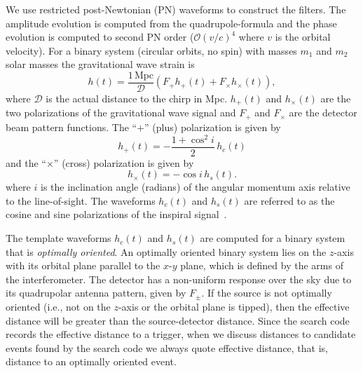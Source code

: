 We use restricted post-Newtonian (PN) waveforms to construct the filters. The
amplitude evolution is computed from the quadrupole-formula\cite{petersmath}
and the phase evolution is computed to second PN order ($\mathcal{O}(v/c)^4$
where $v$ is the orbital velocity).  For a binary system (circular orbits, no
spin) with masses $m_1$ and $m_2$ solar masses the gravitational wave strain
is
\begin{equation}
h(t) = \frac{1\,\mathrm{Mpc}}{\mathcal{D}}\left(F_{+}h_{+}(t) +
F_{\times}h_{\times}(t)\right),
\end{equation}
where $\mathcal{D}$ is the actual distance to the chirp in Mpc. $h_{+}(t)$
and $h_{\times}(t)$ are the two polarizations of the gravitational wave signal
and $F_{+}$ and $F_{\times}$ are the detector beam pattern functions. The
``$+$'' (plus) polarization is given by
\begin{equation}
h_{+}(t) = -\frac{1 + \cos^2 i}{2}\,h_c(t)
\end{equation}
and the ``$\times$'' (cross) polarization is given by
\begin{equation}
h_{\times}(t) = -\cos i\,h_s(t).
\end{equation}
where $i$ is the inclination angle (radians) of the angular momentum axis
relative to the line-of-sight. The waveforms $h_c(t)$ and $h_s(t)$ are referred
to as the cosine and sine polarizations of the inspiral signal~\cite{biww}.

The template waveforms $h_c(t)$ and $h_s(t)$ are computed for a binary
system that is {\it optimally oriented}. An optimally oriented binary system
lies on the $z$-axis with its orbital plane parallel to the $x$-$y$ plane,
which is defined by the arms of the interferometer. The detector has a
non-uniform response over the sky due to its quadrupolar antenna pattern,
given by $F_\pm$. If the source is not optimally oriented (i.e., not on the
$z$-axis or the orbital plane is tipped), then the effective distance will be
greater than the source-detector distance. Since the search code records the
effective distance to a trigger, when we discuss distances to candidate events
found by the search code we always quote effective distance, that is, distance
to an optimally oriented event.

